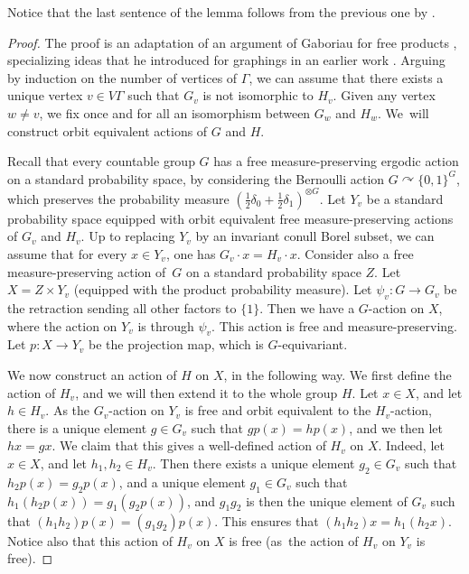 \documentclass[JEP,XML,SOM,Unicode,NoFloatCountersInSection,published]{cedram}
\theoremstyle{plain}
\theoremstyle{definition}
\begin{document}
Notice that the last sentence of the lemma follows from the previous one by \cite[Th.\,2.3]{Gab2}.

\begin{proof}
The proof is an adaptation of an argument of Gaboriau for free products \cite[$\mathbf{P}_{\mathrm{ME}}\mathbf{6}$]{Gab}, specializing ideas that he introduced for graphings in an earlier work \cite[Part\,IV]{Gab-cost}. Arguing by induction on the number of vertices of $\Gamma$, we can assume that there exists a unique vertex $v\in V\Gamma$ such that $G_v$ is not isomorphic to $H_v$. Given any vertex $w\neq v$, we fix once and for all an isomorphism between $G_w$ and $H_w$. We~will construct orbit equivalent actions of $G$ and $H$.

Recall that every countable group $G$ has a free measure-preserving ergodic action on a standard probability space, by considering the Bernoulli action $G\curvearrowright\{0,1\}^G$, which preserves the probability measure $\left(\frac{1}{2}\delta_0+\frac{1}{2}\delta_1\right)^{\otimes G}$. Let $Y_v$ be a standard probability space equipped with orbit equivalent free measure-preserving actions of $G_v$ and $H_v$. Up to replacing $Y_v$ by an invariant conull Borel subset, we can assume that for every $x\in Y_v$, one has $G_v\cdot x=H_v\cdot x$. Consider also a free measure-preserving action of~$G$ on a standard probability space $Z$. Let $X=Z\times Y_v$ (equipped with the product probability measure). Let $\psi_v:G\to G_v$ be the retraction sending all other factors to $\{1\}$. Then we have a $G$-action on $X$, where the action on $Y_v$ is through $\psi_v$. This action is free and measure-preserving. Let $p:X\to Y_v$ be the projection map, which is $G$-equivariant.

We now construct an action of $H$ on $X$, in the following way. We first define the action of $H_v$, and we will then extend it to the whole group $H$. Let $x\in X$, and let $h\in H_v$. As the $G_v$-action on $Y_v$ is free and orbit equivalent to the $H_v$-action, there is a unique element $g\in G_v$ such that $gp(x)=hp(x)$, and we then let $hx=gx$. We claim that this gives a well-defined action of $H_v$ on $X$. Indeed, let $x\in X$, and let $h_1,h_2\in H_v$. Then there exists a unique element $g_2\in G_v$ such that $h_2p(x)=g_2p(x)$, and a unique element $g_1\in G_v$ such that $h_1(h_2p(x))=g_1(g_2p(x))$, and $g_1g_2$ is then the unique element of $G_v$ such that $(h_1h_2)p(x)=(g_1g_2)p(x)$. This ensures that $(h_1h_2)x=h_1(h_2x)$. Notice also that this action of $H_v$ on $X$ is free (as~the action of $H_v$ on $Y_v$ is free).


\end{proof}
\end{document}
